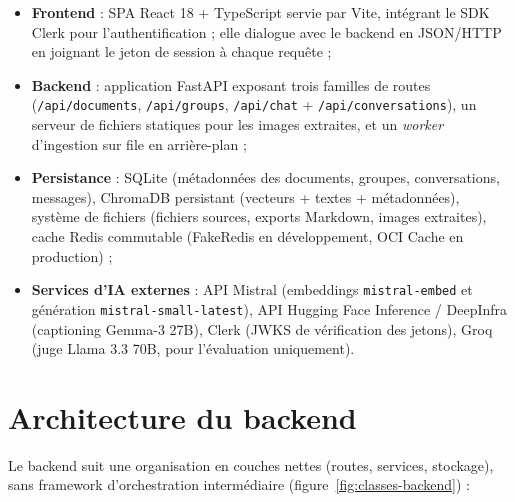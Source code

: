 \begin{itemize}
  \item \textbf{Frontend} : SPA React 18 + TypeScript servie par Vite, intégrant le SDK
        Clerk pour l'authentification ; elle dialogue avec le backend en JSON/HTTP en
        joignant le jeton de session à chaque requête ;
  \item \textbf{Backend} : application FastAPI exposant trois familles de routes
        (\texttt{/api/documents}, \texttt{/api/groups}, \texttt{/api/chat} +
        \texttt{/api/conversations}), un serveur de fichiers statiques pour les images
        extraites, et un \emph{worker} d'ingestion sur file en arrière-plan ;
  \item \textbf{Persistance} : SQLite (métadonnées des documents, groupes, conversations,
        messages), ChromaDB persistant (vecteurs + textes + métadonnées), système de
        fichiers (fichiers sources, exports Markdown, images extraites), cache Redis
        commutable (FakeRedis en développement, OCI Cache en production) ;
  \item \textbf{Services d'IA externes} : API Mistral (embeddings \texttt{mistral-embed}
        et génération \texttt{mistral-small-latest}), API Hugging Face Inference /
        DeepInfra (captioning Gemma-3 27B), Clerk (JWKS de vérification des jetons),
        Groq (juge Llama 3.3 70B, pour l'évaluation uniquement).
\end{itemize}


\section{Architecture du backend}
\label{sec:archi-backend}

Le backend suit une organisation en couches nettes (routes, services, stockage), sans
framework d'orchestration intermédiaire (figure~\ref{fig:classes-backend}) :

